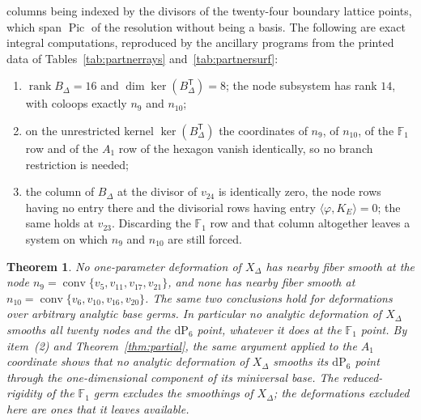 \documentclass[11pt]{amsart}
\newtheorem{theorem}{Theorem}[section]
\theoremstyle{definition}
\theoremstyle{remark}
\theoremstyle{plain}
\newcommand{\conv}{\operatorname{conv}}
\newcommand{\Pic}{\operatorname{Pic}}
\newcommand{\rk}{\operatorname{rank}}
\newcommand{\dP}{\mathrm{dP}}
\begin{document}
columns being indexed by the divisors of the twenty-four boundary
lattice points, which span $\Pic$ of the resolution without being a
basis.  The
following are exact integral computations, reproduced by the ancillary
programs from the printed data of
Tables~\ref{tab:partnerrays} and~\ref{tab:partnersurf}:
\begin{enumerate}
\item $\rk B_{\Delta}=16$ and $\dim\ker(B_{\Delta}^{\mathsf T})=8$;
the node subsystem has rank $14$, with coloops exactly $n_9$ and
$n_{10}$;
\item on the unrestricted kernel $\ker(B_{\Delta}^{\mathsf T})$ the
coordinates of $n_9$, of $n_{10}$, of the $\mathbb F_1$ row and of the
$A_1$ row of the hexagon vanish identically, so no branch restriction
is needed;
\item the column of $B_{\Delta}$ at the divisor of $v_{24}$ is
identically zero, the node rows having no entry there and the
divisorial rows having entry $\langle\varphi,K_E\rangle=0$; the same
holds at $v_{23}$.  Discarding the $\mathbb F_1$ row and that column
altogether leaves a system on which $n_9$ and $n_{10}$ are still
forced.
\end{enumerate}
\begin{theorem}\label{thm:partner}
No one-parameter deformation of $X_{\Delta}$ has nearby fiber smooth
at the node $n_9=\conv\{v_5,v_{11},v_{17},v_{21}\}$, and none has
nearby fiber smooth at $n_{10}=\conv\{v_6,v_{10},v_{16},v_{20}\}$.
The same two conclusions hold for deformations over arbitrary analytic
base germs.  In particular no analytic deformation of $X_{\Delta}$
smooths all twenty nodes and the $\dP_6$ point, whatever it does at the
$\mathbb F_1$ point.  By item~(2) and
Theorem~\ref{thm:partial}, the same argument applied to the $A_1$
coordinate shows that no analytic deformation of $X_{\Delta}$ smooths
its $\dP_6$ point through the one-dimensional component of its miniversal
base.  The reduced-rigidity of the $\mathbb F_1$ germ excludes the
smoothings of $X_{\Delta}$; the deformations excluded here are ones
that it leaves available.
\end{theorem}
\end{document}
